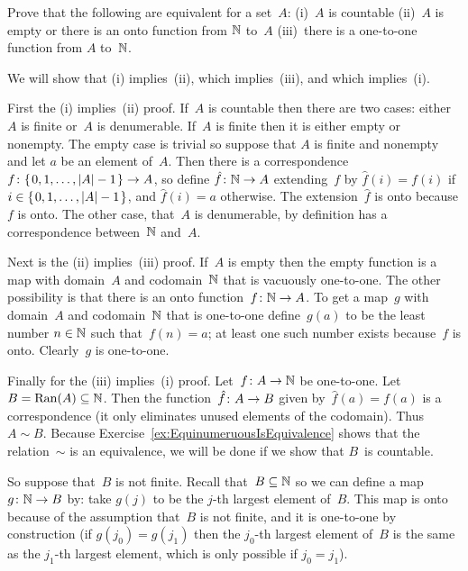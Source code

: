 \begin{ex} \label{ex:OntoFromNatsToSetEquivToCountable}
Prove that the following are equivalent for a set~$A$:
(i)~$A$ is countable
(ii)~$A$ is empty or there is an onto function from $\mathbb{N}$ to~$A$
(iii)~there is a one-to-one function from $A$ to~$\mathbb{N}$.    
\begin{ans}
We will show that (i) implies~(ii), which implies~(iii), and which
implies~(i).

First the (i) implies~(ii) proof.
If~$A$ is countable then there are two cases: either~$A$ is finite 
or~$A$ is denumerable.
If~$A$ is finite then it is either empty or nonempty.
The empty case is trivial so suppose that $A$ is finite and nonempty
and let $a$ be an element of~$A$.
Then there is a correspondence~$\mbox{$f\colon \mbox{$\{\hspace{0.1em}0,1,\ldots,|A|-1\hspace{0.1em}\}$}\to A$}$,
so define $\mbox{$\hat{f}\colon \mathbb{N}\to A$}$ extending~$f$ by
$\hat{f}(i)=f(i)$ if $i\in\mbox{$\{\hspace{0.1em}0,1,\ldots,|A|-1\hspace{0.1em}\}$}$, and 
$\hat{f}(i)=a$ otherwise.
The extension~$\hat{f}$ is onto because $f$ is onto.
The other case, that~$A$ is denumerable, by definition has a 
correspondence between~$\mathbb{N}$ and~$A$.

Next is the (ii) implies~(iii) proof.
If~$A$ is empty then the empty function is a map with domain~$A$ and
codomain~$\mathbb{N}$ that is vacuously one-to-one.
The other possibility is that there is an onto function~$\mbox{$f\colon \mathbb{N}\to A$}$.
To get a map~$g$ with domain~$A$ and codomain~$\mathbb{N}$ that is one-to-one
define~$g(a)$ to be the least number $n\in\mathbb{N}$ such that~$f(n)=a$; 
at least one such number exists because~$f$ is onto.
Clearly~$g$ is one-to-one.

Finally for the (iii) implies~(i) proof.
Let~$\mbox{$f\colon A\to \mathbb{N}$}$ be one-to-one.
Let $B=\operatorname{Ran}(A)\subseteq\mathbb{N}$.
Then the function~$\mbox{$\hat{f}\colon A\to B$}$ given by~$\hat{f}(a)=f(a)$ is a 
correspondence (it only eliminates unused elements of the codomain).
Thus $A\sim B$.
Because Exercise~\ref{ex:EquinumeruousIsEquivalence} shows that the 
relation~$\sim$ is an equivalence, we will be done if we show that $B$~is
countable.

So suppose that~$B$ is not finite.
Recall that~$B\subseteq\mathbb{N}$ so we can define a map
$\mbox{$g\colon \mathbb{N}\to B$}$ by:
take $g(j)$ to be the $j$-th largest element of~$B$.
This map is onto because of the assumption that~$B$ is not finite, and it 
is one-to-one by construction (if $g(j_0)=g(j_1)$ then the $j_0$-th largest
element of~$B$ is the same as the $j_1$-th largest element, which is only
possible if $j_0=j_1$).
\end{ans}
\end{ex}

